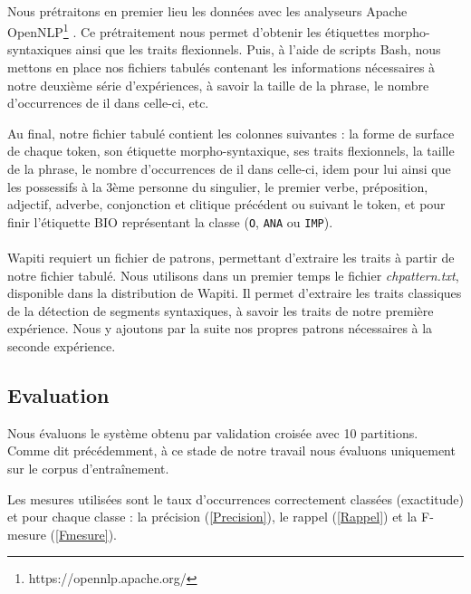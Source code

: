 \documentclass[a4paper,12pt]{article}
\begin{document}
\paragraph{}
Nous prétraitons en premier lieu les données avec les analyseurs Apache OpenNLP\footnote{https://opennlp.apache.org/} \citep{boudin-detection-taln12}. 
Ce prétraitement nous permet d'obtenir les étiquettes morpho-syntaxiques ainsi que les traits flexionnels.
Puis, à l'aide de scripts Bash, nous mettons en place nos fichiers tabulés contenant les informations nécessaires à notre deuxième série d'expériences, à savoir la taille de la phrase, le nombre d'occurrences de \og il \fg{} dans celle-ci, etc.

Au final, notre fichier tabulé contient les colonnes suivantes : la forme de surface de chaque token, son étiquette morpho-syntaxique, ses traits flexionnels, la taille de la phrase, le nombre d'occurrences de \og il \fg{} dans celle-ci, idem pour \og lui \fg{} ainsi que les possessifs à la 3ème personne du singulier, le premier verbe, préposition, adjectif, adverbe, conjonction et clitique précédent ou suivant le token, et pour finir l'étiquette BIO représentant la classe (\verb!O!, \verb!ANA! ou \verb!IMP!).

\paragraph{}
Wapiti requiert un fichier de patrons, permettant d'extraire les traits à partir de notre fichier tabulé. Nous utilisons dans un premier temps le fichier \emph{chpattern.txt}, disponible dans la distribution de Wapiti. Il permet d'extraire les traits classiques de la détection de segments syntaxiques, à savoir les traits de notre première expérience. Nous y ajoutons par la suite nos propres patrons nécessaires à la seconde expérience.


\subsection{Evaluation}

Nous évaluons le système obtenu par validation croisée avec 10 partitions. Comme dit précédemment, à ce stade de notre travail nous évaluons uniquement sur le corpus d'entraînement.

Les mesures utilisées sont le taux d'occurrences correctement classées (exactitude) et pour chaque classe : la précision (\ref{Precision}), le rappel (\ref{Rappel}) et la F-mesure (\ref{Fmesure}).
\end{document}
